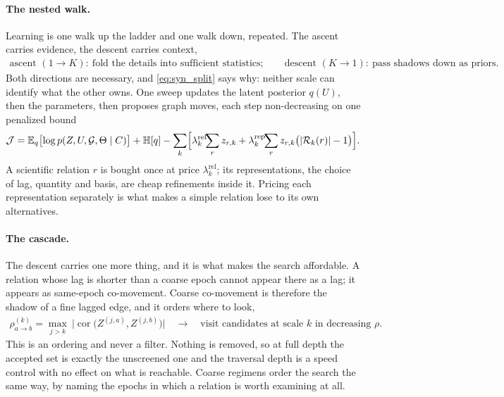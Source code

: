 \paragraph{The nested walk.}
Learning is one walk up the ladder and one walk down, repeated. The ascent
carries evidence, the descent carries context,
\begin{align}
 \text{ascent }(1\!\to\!K):\ \text{fold the details into sufficient statistics};
 \qquad
 \text{descent }(K\!\to\!1):\ \text{pass shadows down as priors} .
 \label{eq:syn_walk}
\end{align}
Both directions are necessary, and \cref{eq:syn_split} says why: neither scale
can identify what the other owns. One sweep updates the latent posterior
\(q(U)\), then the parameters, then proposes graph moves, each step
non-decreasing on one penalized bound
\begin{align}
 \mathcal J
 =\mathbb E_q\bigl[\log p(Z,U,\mathcal G,\Theta\mid C)\bigr]
 +\mathbb H[q]
 -\sum_k\Bigl[\lambda_k^{\mathrm{rel}}\!\!\sum_{r}z_{r,k}
 +\lambda_k^{\mathrm{rep}}\!\!\sum_{r}z_{r,k}\bigl(|\mathcal R_k(r)|-1\bigr)\Bigr] .
 \label{eq:syn_objective}
\end{align}
A scientific relation \(r\) is bought once at price
\(\lambda_k^{\mathrm{rel}}\); its representations, the choice of lag, quantity
and basis, are cheap refinements inside it. Pricing each representation
separately is what makes a simple relation lose to its own alternatives.

\paragraph{The cascade.}
The descent carries one more thing, and it is what makes the search
affordable. A relation whose lag is shorter than a coarse epoch cannot appear
there as a lag; it appears as same-epoch co-movement. Coarse co-movement is
therefore the shadow of a fine lagged edge, and it orders where to look,
\begin{align}
 \rho_{a\to b}^{(k)}
 =\max_{j>k}\ \bigl|\operatorname{cor}\bigl(Z^{(j,a)},Z^{(j,b)}\bigr)\bigr|
 \quad\longrightarrow\quad
 \text{visit candidates at scale }k\text{ in decreasing }\rho .
 \label{eq:syn_cascade}
\end{align}
This is an ordering and never a filter. Nothing is removed, so at full depth
the accepted set is exactly the unscreened one and the traversal depth is a
speed control with no effect on what is reachable. Coarse regimens order the
search the same way, by naming the epochs in which a relation is worth
examining at all.

